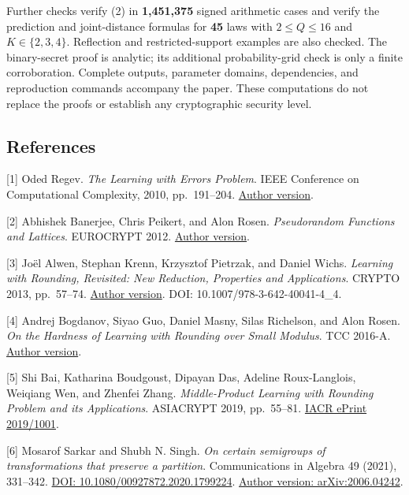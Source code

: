 \documentclass[
]{article}
\begin{document}
Further checks verify (2) in \textbf{1,451,375} signed arithmetic cases
and verify the prediction and joint-distance formulas for \textbf{45}
laws with \(2\le Q\le16\) and \(K\in\{2,3,4\}\). Reflection and
restricted-support examples are also checked. The binary-secret proof is
analytic; its additional probability-grid check is only a finite
corroboration. Complete outputs, parameter domains, dependencies, and
reproduction commands accompany the paper. These computations do not
replace the proofs or establish any cryptographic security level.

\subsection{References}\label{references}

{[}1{]} Oded Regev. \emph{The Learning with Errors Problem}. IEEE
Conference on Computational Complexity, 2010, pp.~191--204.
\href{https://cims.nyu.edu/~regev/papers/lwesurvey.pdf}{Author version}.

{[}2{]} Abhishek Banerjee, Chris Peikert, and Alon Rosen.
\emph{Pseudorandom Functions and Lattices}. EUROCRYPT 2012.
\href{https://web.eecs.umich.edu/~cpeikert/pubs/prf-lattice.pdf}{Author
version}.

{[}3{]} Joël Alwen, Stephan Krenn, Krzysztof Pietrzak, and Daniel Wichs.
\emph{Learning with Rounding, Revisited: New Reduction, Properties and
Applications}. CRYPTO 2013, pp.~57--74.
\href{https://crypto.ethz.ch/publications/files/AKPW13.pdf}{Author
version}. DOI: 10.1007/978-3-642-40041-4\_4.

{[}4{]} Andrej Bogdanov, Siyao Guo, Daniel Masny, Silas Richelson, and
Alon Rosen. \emph{On the Hardness of Learning with Rounding over Small
Modulus}. TCC 2016-A.
\href{https://people.csail.mit.edu/sirichel/lwr.pdf}{Author version}.

{[}5{]} Shi Bai, Katharina Boudgoust, Dipayan Das, Adeline
Roux-Langlois, Weiqiang Wen, and Zhenfei Zhang. \emph{Middle-Product
Learning with Rounding Problem and its Applications}. ASIACRYPT 2019,
pp.~55--81. \href{https://eprint.iacr.org/2019/1001}{IACR ePrint
2019/1001}.

{[}6{]} Mosarof Sarkar and Shubh N. Singh. \emph{On certain semigroups
of transformations that preserve a partition}. Communications in Algebra
49 (2021), 331--342.
\href{https://doi.org/10.1080/00927872.2020.1799224}{DOI:
10.1080/00927872.2020.1799224}.
\href{https://arxiv.org/abs/2006.04242}{Author version:
arXiv:2006.04242}.
\end{document}
